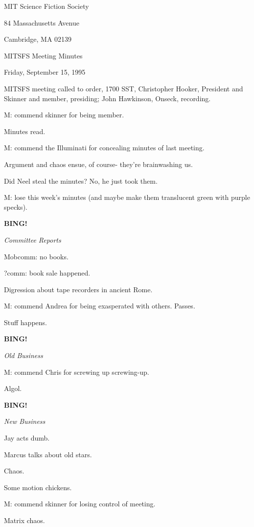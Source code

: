 \documentclass[12pt]{article}
\newcommand{\bing}{{\bf BING!} }
\newcommand{\goto}[1]{\bing \vskip 12pt \centerline{{\em{#1}}}}
\begin{document}
\begin{center}

MIT Science Fiction Society 

84 Massachusetts Avenue

Cambridge, MA 02139

\vspace{12pt}

MITSFS Meeting Minutes 

Friday, September 15, 1995

\end{center}
 
\vspace{18pt}

\setlength{\parskip}{6pt}

\noindent
MITSFS meeting called to order, 1700 SST,
Christopher Hooker, President and Skinner and member, presiding; John Hawkinson, Onseck, recording.

M: commend skinner for being member.

Minutes read.

M: commend the Illuminati for concealing minutes of last meeting.

Argument and chaos ensue, of course- they're brainwashing us.

Did Neel steal the minutes? No, he just took them.

M: lose this week's minutes (and maybe make them translucent green with purple specks).

\goto{Committee Reports}

Mobcomm: no books.

?comm: book sale happened.

Digression about tape recorders in ancient Rome.

M: commend Andrea for being exasperated with others. Passes.

Stuff happens.

\goto{Old Business}

M: commend Chris for screwing up screwing-up.

Algol.

\goto{New Business}

Jay acts dumb.

Marcus talks about old stars.

Chaos.

Some motion chickens.

M: commend skinner for losing control of meeting.

Matrix chaos.
\end{document}
